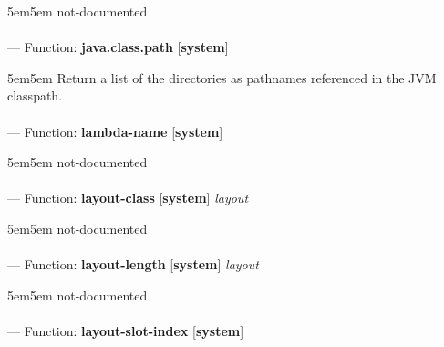 \begin{adjustwidth}{5em}{5em}
not-documented
\end{adjustwidth}

\paragraph{}
\label{SYSTEM:JAVA.CLASS.PATH}
--- Function: \textbf{java.class.path} [\textbf{system}] \textit{}

\begin{adjustwidth}{5em}{5em}
Return a list of the directories as pathnames referenced in the JVM classpath.
\end{adjustwidth}

\paragraph{}
\label{SYSTEM:LAMBDA-NAME}
--- Function: \textbf{lambda-name} [\textbf{system}] \textit{}

\begin{adjustwidth}{5em}{5em}
not-documented
\end{adjustwidth}

\paragraph{}
\label{SYSTEM:LAYOUT-CLASS}
--- Function: \textbf{layout-class} [\textbf{system}] \textit{layout}

\begin{adjustwidth}{5em}{5em}
not-documented
\end{adjustwidth}

\paragraph{}
\label{SYSTEM:LAYOUT-LENGTH}
--- Function: \textbf{layout-length} [\textbf{system}] \textit{layout}

\begin{adjustwidth}{5em}{5em}
not-documented
\end{adjustwidth}

\paragraph{}
\label{SYSTEM:LAYOUT-SLOT-INDEX}
--- Function: \textbf{layout-slot-index} [\textbf{system}] \textit{}

